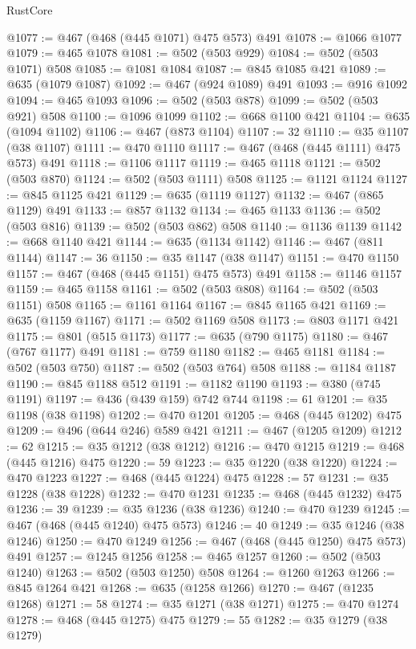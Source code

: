 \begin{lexlean}{RustCore}
\begin{coremodule}
@1077 := @467 (@468 (@445 @1071) @475 @573) @491
@1078 := @1066 @1077
@1079 := @465 @1078
@1081 := @502 (@503 @929)
@1084 := @502 (@503 @1071) @508
@1085 := @1081 @1084
@1087 := @845 @1085 @421
@1089 := @635 (@1079 @1087)
@1092 := @467 (@924 @1089) @491
@1093 := @916 @1092
@1094 := @465 @1093
@1096 := @502 (@503 @878)
@1099 := @502 (@503 @921) @508
@1100 := @1096 @1099
@1102 := @668 @1100 @421
@1104 := @635 (@1094 @1102)
@1106 := @467 (@873 @1104)
@1107 := 32
@1110 := @35 @1107 (@38 @1107)
@1111 := @470 @1110
@1117 := @467 (@468 (@445 @1111) @475 @573) @491
@1118 := @1106 @1117
@1119 := @465 @1118
@1121 := @502 (@503 @870)
@1124 := @502 (@503 @1111) @508
@1125 := @1121 @1124
@1127 := @845 @1125 @421
@1129 := @635 (@1119 @1127)
@1132 := @467 (@865 @1129) @491
@1133 := @857 @1132
@1134 := @465 @1133
@1136 := @502 (@503 @816)
@1139 := @502 (@503 @862) @508
@1140 := @1136 @1139
@1142 := @668 @1140 @421
@1144 := @635 (@1134 @1142)
@1146 := @467 (@811 @1144)
@1147 := 36
@1150 := @35 @1147 (@38 @1147)
@1151 := @470 @1150
@1157 := @467 (@468 (@445 @1151) @475 @573) @491
@1158 := @1146 @1157
@1159 := @465 @1158
@1161 := @502 (@503 @808)
@1164 := @502 (@503 @1151) @508
@1165 := @1161 @1164
@1167 := @845 @1165 @421
@1169 := @635 (@1159 @1167)
@1171 := @502 @1169 @508
@1173 := @803 @1171 @421
@1175 := @801 (@515 @1173)
@1177 := @635 (@790 @1175)
@1180 := @467 (@767 @1177) @491
@1181 := @759 @1180
@1182 := @465 @1181
@1184 := @502 (@503 @750)
@1187 := @502 (@503 @764) @508
@1188 := @1184 @1187
@1190 := @845 @1188 @512
@1191 := @1182 @1190
@1193 := @380 (@745 @1191)
@1197 := @436 (@439 @159) @742 @744
@1198 := 61
@1201 := @35 @1198 (@38 @1198)
@1202 := @470 @1201
@1205 := @468 (@445 @1202) @475
@1209 := @496 (@644 @246) @589 @421
@1211 := @467 (@1205 @1209)
@1212 := 62
@1215 := @35 @1212 (@38 @1212)
@1216 := @470 @1215
@1219 := @468 (@445 @1216) @475
@1220 := 59
@1223 := @35 @1220 (@38 @1220)
@1224 := @470 @1223
@1227 := @468 (@445 @1224) @475
@1228 := 57
@1231 := @35 @1228 (@38 @1228)
@1232 := @470 @1231
@1235 := @468 (@445 @1232) @475
@1236 := 39
@1239 := @35 @1236 (@38 @1236)
@1240 := @470 @1239
@1245 := @467 (@468 (@445 @1240) @475 @573)
@1246 := 40
@1249 := @35 @1246 (@38 @1246)
@1250 := @470 @1249
@1256 := @467 (@468 (@445 @1250) @475 @573) @491
@1257 := @1245 @1256
@1258 := @465 @1257
@1260 := @502 (@503 @1240)
@1263 := @502 (@503 @1250) @508
@1264 := @1260 @1263
@1266 := @845 @1264 @421
@1268 := @635 (@1258 @1266)
@1270 := @467 (@1235 @1268)
@1271 := 58
@1274 := @35 @1271 (@38 @1271)
@1275 := @470 @1274
@1278 := @468 (@445 @1275) @475
@1279 := 55
@1282 := @35 @1279 (@38 @1279)

\end{coremodule}
\end{lexlean}

